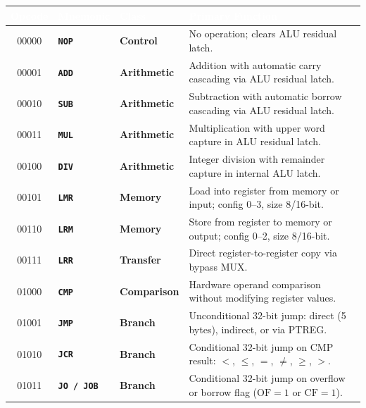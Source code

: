 \documentclass[11pt,a4paper]{article}
\begin{document}
\small
\noindent
\begin{tabularx}{\textwidth}{@{}c l l >{\raggedright\arraybackslash}X@{}}
\toprule
\rowcolor{limslate}
\textcolor{white}{\textbf{Opcode}} & \textcolor{white}{\textbf{Mnemonic}} & \textcolor{white}{\textbf{Class}} & \textcolor{white}{\textbf{Primary Function}} \\
\midrule
\rowcolors{2}{limroweven}{white}
00000 & \texttt{\textbf{NOP}}  & \textcolor{limmuted}{\textbf{Control}}     & No operation; clears ALU residual latch. \\
00001 & \texttt{\textbf{ADD}}  & \textcolor{limorangeaccent}{\textbf{Arithmetic}} & Addition with automatic carry cascading via ALU residual latch. \\
00010 & \texttt{\textbf{SUB}}  & \textcolor{limorangeaccent}{\textbf{Arithmetic}} & Subtraction with automatic borrow cascading via ALU residual latch. \\
00011 & \texttt{\textbf{MUL}}  & \textcolor{limorangeaccent}{\textbf{Arithmetic}} & Multiplication with upper word capture in ALU residual latch. \\
00100 & \texttt{\textbf{DIV}}  & \textcolor{limorangeaccent}{\textbf{Arithmetic}} & Integer division with remainder capture in internal ALU latch. \\
00101 & \texttt{\textbf{LMR}}  & \textcolor{limdark}{\textbf{Memory}}       & Load into register from memory or input; config 0--3, size 8/16-bit. \\
00110 & \texttt{\textbf{LRM}}  & \textcolor{limdark}{\textbf{Memory}}       & Store from register to memory or output; config 0--2, size 8/16-bit. \\
00111 & \texttt{\textbf{LRR}}  & \textcolor{limdark}{\textbf{Transfer}}     & Direct register-to-register copy via bypass MUX. \\
01000 & \texttt{\textbf{CMP}}  & \textcolor{limorangeaccent}{\textbf{Comparison}} & Hardware operand comparison without modifying register values. \\
01001 & \texttt{\textbf{JMP}}  & \textcolor{limdark}{\textbf{Branch}}       & Unconditional 32-bit jump: direct (5 bytes), indirect, or via PTREG. \\
01010 & \texttt{\textbf{JCR}}  & \textcolor{limdark}{\textbf{Branch}}       & Conditional 32-bit jump on CMP result: $<$, $\le$, $=$, $\ne$, $\ge$, $>$. \\
01011 & \texttt{\textbf{JO / JOB}} & \textcolor{limdark}{\textbf{Branch}}   & Conditional 32-bit jump on overflow or borrow flag (\(\text{OF}=1\) or \(\text{CF}=1\)). \\

\end{tabularx}
\end{document}
